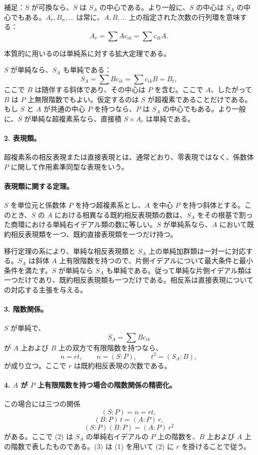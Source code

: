 補足：\(S\) が可換なら、\(S\) は \(S_A\) の中心である。より一般に、\(S\) の中心は \(S_A\) の中心でもある。\(A_r,B_n,\ldots\) は常に、\(A,B,\ldots\) 上の指定された次数の行列環を意味する：
\[
        A_r=\sum A c_{ik}=\sum c_{ik}A.
\]

本質的に用いるのは単純系に対する拡大定理である。

\(S\) が単純なら、\(S_A\) も単純である：
\[
        S_A=\sum Bc_{ik}=\sum c_{ik}B=B_t,
\]
ここで \(B\) は随伴する斜体であり、その中心は \(P\) を含む。ここで \(A\)、したがって \(B\) は \(P\) 上無限階数でもよい。仮定するのは \(S\) が超複素であることだけである。もし \(S\) と \(A\) が共通の中心 \(P\) を持つなら、\(P\) は \(S_A\) の中心でもある。より一般に、\(S\) が単純な超複素系なら、直接積 \(S\times A_r\) は単純である。

\paragraph{2. 表現類。}
超複素系の相反表現または直接表現とは、通常どおり、零表現ではなく、係数体 \(P\) に関して作用素準同型な表現をいう。

\paragraph{表現類に関する定理。}
\(S\) を単位元と係数体 \(P\) を持つ超複素系とし、\(A\) を中心 \(P\) を持つ斜体とする。このとき、\(S\) の \(A\) における相異なる既約相反表現類の数は、\(S_A\) をその根基で割った商環における単純右イデアル類の数に等しい。\(S\) が単純系なら、\(A\) において既約相反表現類を一つ、既約直接表現類を一つだけ持つ。

移行定理の系により、単純な相反表現類と \(S_A\) 上の単純加群類は一対一に対応する。\(S_A\) は斜体 \(A\) 上有限階数を持つので、片側イデアルについて最大条件と最小条件を満たす。\(S\) が単純なら \(S_A\) も単純である。従って単純な片側イデアル類は一つだけであり、既約相反表現類も一つだけである。相反系は直接表現についての対応する主張を与える。

\paragraph{3. 階数関係。}
\(S\) が単純で、
\[
        S_A=\sum Bc_{ik}
\]
が \(A\) 上および \(B\) 上の双方で有限階数を持つなら、
\[
        n=rt,
        \qquad n=(S:P),
        \qquad t^2=(S_A:B),                                             \tag{1}
\]
が成り立つ。ここで \(r\) は既約相反表現の次数である。

\paragraph{4. \(A\) が \(P\) 上有限階数を持つ場合の階数関係の精密化。}
この場合には三つの関係
\[
        (S:P)=n=rt,                                                     \tag{1}
\]
\[
        (B:P)\,t=(A:P)\,r,                                               \tag{2}
\]
\[
        (S:P)(B:P)=(A:P)\,r^2                                           \tag{3}
\]
がある。ここで (2) は \(S_A\) の単純右イデアルの \(P\) 上の階数を、\(B\) 上および \(A\) 上の階数で表したものである。(3) は (1) を用いて (2) に \(r\) を掛けることで従う。

